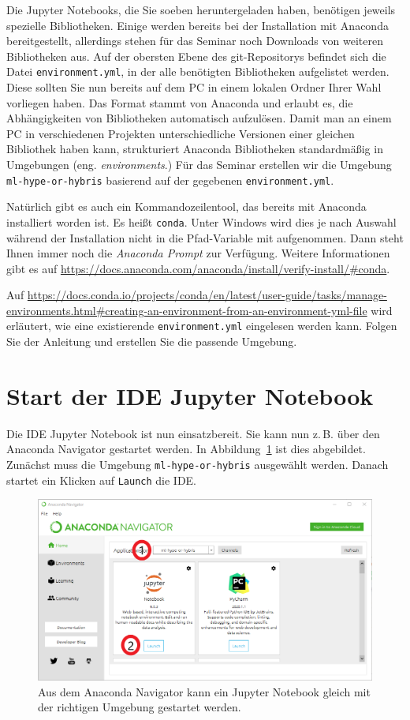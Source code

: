 \documentclass{tufte-handout}
\begin{document}
Die Jupyter Notebooks, die Sie soeben heruntergeladen haben, benötigen jeweils spezielle Bibliotheken.
Einige werden bereits bei der Installation mit Anaconda bereitgestellt, allerdings stehen für das Seminar noch Downloads von weiteren Bibliotheken aus.
Auf der obersten Ebene des git-Repositorys befindet sich die Datei \texttt{environment.yml}, in der alle benötigten Bibliotheken aufgelistet werden.
Diese sollten Sie nun bereits auf dem PC in einem lokalen Ordner Ihrer Wahl vorliegen haben.
Das Format stammt von Anaconda und erlaubt es, die Abhängigkeiten von Bibliotheken automatisch aufzulösen.
Damit man an einem PC in verschiedenen Projekten unterschiedliche Versionen einer gleichen Bibliothek haben kann,
strukturiert Anaconda Bibliotheken standardmäßig in Umgebungen (eng. \emph{environments}.)
Für das Seminar erstellen wir die Umgebung \texttt{ml-hype-or-hybris} basierend auf der gegebenen \texttt{environment.yml}.

Natürlich gibt es auch ein Kommandozeilentool, das bereits mit Anaconda installiert worden ist.
Es heißt \texttt{conda}.
Unter Windows wird dies je nach Auswahl während der Installation nicht in die Pfad-Variable mit aufgenommen.
Dann steht Ihnen immer noch die \emph{Anaconda Prompt} zur Verfügung.
Weitere Informationen gibt es auf
\url{https://docs.anaconda.com/anaconda/install/verify-install/#conda}.

Auf
\url{https://docs.conda.io/projects/conda/en/latest/user-guide/tasks/manage-environments.html#creating-an-environment-from-an-environment-yml-file}
wird erläutert, wie eine existierende \texttt{environment.yml} eingelesen werden kann.
Folgen Sie der Anleitung und erstellen Sie die passende Umgebung.

\section{Start der IDE Jupyter Notebook}

Die IDE Jupyter Notebook ist nun einsatzbereit.
Sie kann nun z.\,B. über den Anaconda Navigator gestartet werden.
In Abbildung~\ref{fig:start-ide} ist dies abgebildet.
Zunächst muss die Umgebung \texttt{ml-hype-or-hybris} ausgewählt werden.
Danach startet ein Klicken auf \texttt{Launch} die IDE.

\begin{figure}[h]
  \includegraphics{starte_jupyter_notebook}
  \caption{Aus dem Anaconda Navigator kann ein Jupyter Notebook gleich mit der richtigen Umgebung gestartet werden.}%
\label{fig:start-ide}
\end{figure}




\end{document}
